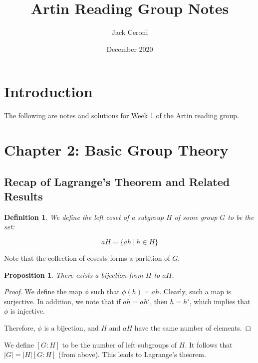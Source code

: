 \documentclass[10pt, oneside]{article}
\title{Artin Reading Group Notes}
\author{Jack Ceroni}
\date{December 2020}
\newtheorem{defn}{Definition}
\newtheorem{prop}{Proposition}
\begin{document}
    \maketitle
    \tableofcontents

    \vspace{.25in}

    \newpage

    \section{Introduction}

    The following are notes and solutions for Week 1 of the Artin reading group.

    \section{Chapter 2: Basic Group Theory}

    \subsection{Recap of Lagrange's Theorem and Related Results}

    \begin{defn}
      We define the left coset of a subgroup $H$ of some group $G$ to be the set:

      $$aH = \{ ah \ | \ h \in H\}$$
    \end{defn}

    Note that the collection of cosests forms a partition of $G$.

    \begin{prop}
      There exists a bijection from $H$ to $aH$.
    \end{prop}

    \begin{proof}
      We define the map $\phi$ such that $\phi(h) = ah$. Clearly, such a map is surjective. In addition, we note that
      if $ah = ah'$, then $h = h'$, which implies that $\phi$ is injective.
      \newline

      Therefore, $\phi$ is a bijection, and $H$ and $aH$ have the same number of elements.
    \end{proof}

    We define $[G : H]$ to be the number of left subgroups of $H$. It follows that $|G| = |H| [G : H]$ (from above). This leads to
    Lagrange's theorem.
\end{document}
